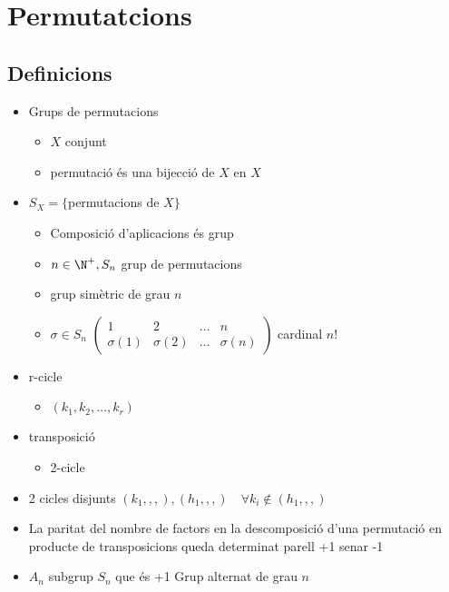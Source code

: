 \section{Permutatcions}
\subsection*{Definicions}
\begin{itemize}
\item Grups de permutacions
	\begin{itemize}
	\item $X$ conjunt
	\item permutació és una bijecció de $X$ en $X$
	\end{itemize}
\item $S_X = \{$permutacions de $X\}$
	\begin{itemize}
	\item Composició d'aplicacions és grup
	\item $n \in \N^+, S_n$ grup de permutacions
	\item grup simètric de grau $n$
	\item $\sigma \in S_n$
		\subitem $\begin{pmatrix}1 & 2 & \dots & n\\ \sigma(1) & \sigma(2) & \dots & \sigma(n)\end{pmatrix}$ cardinal $n!$
	\end{itemize}
\item r-cicle
	\begin{itemize}
	\item $(k_1, k_2, \dots, k_r)$
	\end{itemize}
\item transposició
	\begin{itemize}
	\item 2-cicle
	\end{itemize}
\item 2 cicles disjunts
	\subitem $(k_1,,,), (h_1,,,)\quad \forall k_i \notin (h_1,,,)$
\item La paritat del nombre de factors en la descomposició d'una permutació en producte de transposicions queda determinat
	\subitem[Si] parell +1
	\subitem[Si] senar -1
\item $A_n$ subgrup $S_n$ que és +1
	\subitem Grup alternat de grau $n$
\end{itemize}

